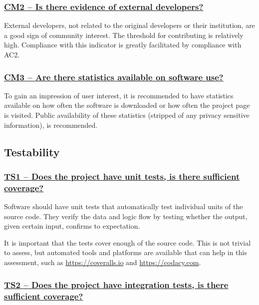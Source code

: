 \documentclass[a4paper,11pt]{article}
\newcommand{\indicator}[1]{\subsubsection*{\underline{#1}}}
\begin{document}
\newcommand{\cmTwoName}{CM2}
\newcommand{\cmTwoID}{\cmTwoName}
\newcommand{\cmTwoText}{Is there evidence of external developers?}
\indicator{\cmTwoName{ }--{ }\cmTwoText}\label{id:cm2} 

External developers, not related to the original developers or their
institution, are a good sign of community interest. The threshold for
contributing is relatively high. Compliance with this indicator is greatly
facilitated by compliance with AC2.

\newcommand{\cmThreeName}{CM3}
\newcommand{\cmThreeID}{\cmThreeName}
\newcommand{\cmThreeText}{Are there statistics available on software use?}
\indicator{\cmThreeName{ }--{ }\cmThreeText}\label{id:cm3} 

To gain an impression of user interest, it is recommended to have statistics
available on how often the software is downloaded or how often the project page
is visited. Public availability of these statistics (stripped of any privacy
sensitive information), is recommended.

\subsection{Testability}\label{sec:tes}

\newcommand{\tsOneName}{TS1}
\newcommand{\tsOneID}{\tsOneName}
\newcommand{\tsOneText}{Does the project have unit tests, is there sufficient coverage?}
\indicator{\tsOneName{ }--{ }\tsOneText}\label{id:ts1} 

Software should have unit tests that automatically test individual units of the
source code. They verify the data and logic flow by testing whether the output,
given certain input, confirms to expectation.

It is important that the tests cover enough of the source code. This is not
trivial to assess, but automated tools
and platforms are available that can help in this assessment, such as
\url{https://coveralls.io} and \url{https://codacy.com}.

\newcommand{\tsTwoName}{TS2}
\newcommand{\tsTwoID}{\tsTwoName}
\newcommand{\tsTwoText}{Does the project have integration tests, is there sufficient coverage?}
\indicator{\tsTwoName{ }--{ }\tsTwoText}\label{id:ts2} 
\end{document}
